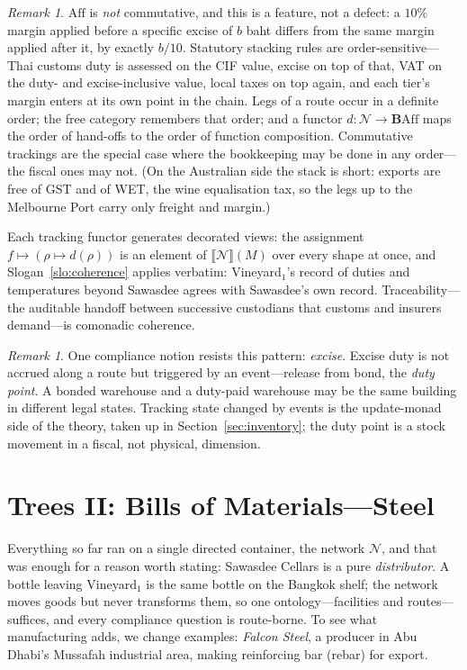 \documentclass[11pt,a4paper]{article}
\newcommand{\Ext}[1]{\llbracket #1 \rrbracket}
\newcommand{\N}{\mathcal{N}}
\theoremstyle{plain}
\theoremstyle{definition}
\theoremstyle{remark}
\newtheorem{remark}[theorem]{Remark}
\begin{document}
\begin{remark}\label{rem:noncommutative}
$\mathrm{Aff}$ is \emph{not} commutative, and this is a feature, not a
defect: a $10\%$ margin applied before a specific excise of $b$ baht
differs from the same margin applied after it, by exactly
$b/10$. Statutory stacking rules are order-sensitive---Thai customs
duty is assessed on the CIF value, excise on top of that, VAT on the
duty- and excise-inclusive value, local taxes on top again, and each
tier's margin enters at its own point in the chain. Legs of a route
occur in a definite order; the free category remembers that order;
and a functor $d : \N \to \mathbf{B}\mathrm{Aff}$ maps the order of
hand-offs to the order of function composition. Commutative
trackings are the special case where the bookkeeping may be done in
any order---the fiscal ones may not. (On the Australian side the
stack is short: exports are free of GST and of WET, the wine
equalisation tax, so the legs up to the Melbourne Port carry only
freight and margin.)
\end{remark}

Each tracking functor generates decorated views: the assignment
$f \mapsto (\rho \mapsto d(\rho))$ is an element of $\Ext{\N}(M)$ over
every shape at once, and Slogan~\ref{slo:coherence} applies verbatim:
Vineyard$_1$'s record of duties and temperatures beyond Sawasdee
agrees with Sawasdee's own record. Traceability---the auditable
handoff between successive custodians that customs and insurers
demand---is comonadic coherence.

\begin{remark}\label{rem:dutypoint}
One compliance notion resists this pattern: \emph{excise}. Excise duty
is not accrued along a route but triggered by an event---release from
bond, the \emph{duty point}. A bonded warehouse and a duty-paid
warehouse may be the same building in different legal states. Tracking
state changed by events is the update-monad side of the theory, taken
up in Section~\ref{sec:inventory}; the duty point is a stock movement
in a fiscal, not physical, dimension.
\end{remark}

\section{Trees II: Bills of Materials---Steel}\label{sec:steel}

Everything so far ran on a single directed container, the network
$\N$, and that was enough for a reason worth stating: Sawasdee
Cellars is a pure \emph{distributor}. A bottle leaving Vineyard$_1$
is the same bottle on the Bangkok shelf; the network moves goods but
never transforms them, so one ontology---facilities and
routes---suffices, and every compliance question is route-borne. To
see what manufacturing adds, we change examples: \emph{Falcon
Steel}, a producer in Abu Dhabi's Mussafah industrial area, making
reinforcing bar (rebar) for export.
\end{document}
